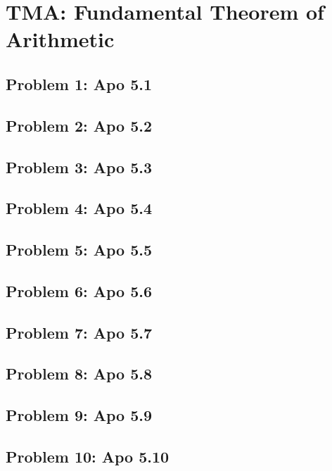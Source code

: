 \section{TMA: Fundamental Theorem of Arithmetic}

\subsection[Problem 1]{Problem 1: Apo 5.1}

\subsection[Problem 2]{Problem 2: Apo 5.2}

\subsection[Problem 3]{Problem 3: Apo 5.3}

\subsection[Problem 4]{Problem 4: Apo 5.4}

\subsection[Problem 5]{Problem 5: Apo 5.5}

\subsection[Problem 6]{Problem 6: Apo 5.6}

\subsection[Problem 7]{Problem 7: Apo 5.7}

\subsection[Problem 8]{Problem 8: Apo 5.8}

\subsection[Problem 9]{Problem 9: Apo 5.9}

\subsection[Problem 10]{Problem 10: Apo 5.10}